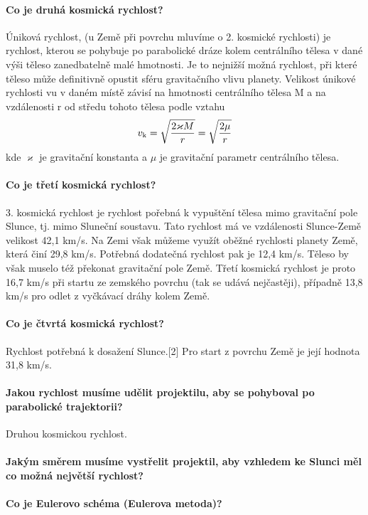 \documentclass[11pt,a4paper,notitlepage,twocolumn]{article}
\begin{document}
\paragraph{Co je druhá kosmická rychlost?}
Úniková rychlost, (u Země při povrchu mluvíme o 2. kosmické rychlosti) je rychlost, 
kterou se pohybuje po parabolické dráze kolem centrálního tělesa v dané výši těleso 
zanedbatelně malé hmotnosti. Je to nejnižší možná rychlost, při které těleso může definitivně
opustit sféru gravitačního vlivu planety.
Velikost únikové rychlosti vu v daném místě závisí na hmotnosti centrálního 
tělesa M a na vzdálenosti r od středu tohoto tělesa podle vztahu
\[ v_{\rm k} = \sqrt \frac{ 2\varkappa M }{r} = \sqrt \frac{2\mu}{r} \]
kde $ \varkappa $ je gravitační konstanta a $ \mu $ je gravitační parametr centrálního tělesa.

\paragraph{Co je třetí kosmická rychlost?}
3. kosmická rychlost je rychlost pořebná k vypuštění tělesa mimo gravitační pole Slunce, tj. mimo Sluneční soustavu. Tato rychlost má ve vzdálenosti Slunce-Země velikost 42,1 km/s. Na Zemi však můžeme využít oběžné rychlosti planety Země, která činí 29,8 km/s. Potřebná dodatečná rychlost pak je 12,4 km/s. Těleso by však muselo též překonat gravitační pole Země. Třetí kosmická rychlost je proto 16,7 km/s při startu ze zemského povrchu (tak se udává nejčastěji), případně 13,8 km/s pro odlet z vyčkávací dráhy kolem Země.

\paragraph{Co je čtvrtá kosmická rychlost?}
Rychlost potřebná k dosažení Slunce.[2] Pro start z povrchu Země je její hodnota 31,8 km/s.
\paragraph{Jakou rychlost musíme udělit projektilu, aby se pohyboval po parabolické trajektorii?}
Druhou kosmickou rychlost.
\paragraph{Jakým směrem musíme vystřelit projektil, aby vzhledem ke Slunci měl co možná největší rychlost?}
\paragraph{Co je Eulerovo schéma (Eulerova metoda)?}
\end{document}
